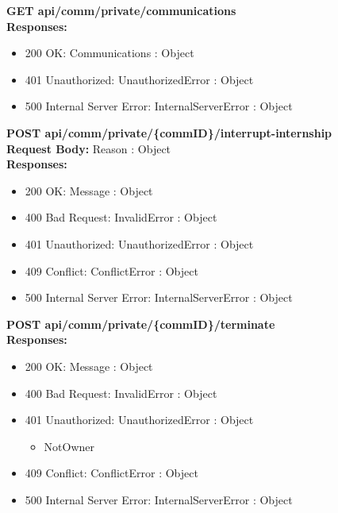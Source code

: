 \noindent\textbf{\color{titleColor}GET api/comm/private/communications}
\vspace{2pt}
\\\textbf{\color{titleColor}Responses:} 
\begin{itemize}
    \item {\color{titleColor}200 OK:} Communications : Object
    \item {\color{titleColor}401 Unauthorized:} UnauthorizedError : Object
    \item {\color{titleColor}500 Internal Server Error:} InternalServerError : Object
\end{itemize}
\vspace{10pt}
\noindent{\color{titleColor}\rule{0.8\linewidth}{0.2mm}}
\vspace{10pt}

\noindent\textbf{\color{titleColor}POST api/comm/private/\{commID\}/interrupt-internship}
\vspace{2pt}
\\\textbf{\color{titleColor}Request Body:} Reason : Object 
\vspace{4pt}
\\\textbf{\color{titleColor}Responses:} 
\begin{itemize}
    \item {\color{titleColor}200 OK:} Message : Object
    \item {\color{titleColor}400 Bad Request:} InvalidError : Object
    \item {\color{titleColor}401 Unauthorized:} UnauthorizedError : Object
    \item {\color{titleColor}409 Conflict:} ConflictError : Object
    \item {\color{titleColor}500 Internal Server Error:} InternalServerError : Object
\end{itemize}
\vspace{10pt}
\noindent{\color{titleColor}\rule{0.8\linewidth}{0.2mm}}
\vspace{10pt}

\noindent\textbf{\color{titleColor}POST api/comm/private/\{commID\}/terminate}
\vspace{2pt}
\\\textbf{\color{titleColor}Responses:} 
\begin{itemize}
    \item {\color{titleColor}200 OK:} Message : Object
    \item {\color{titleColor}400 Bad Request:} InvalidError : Object
    \item {\color{titleColor}401 Unauthorized:} UnauthorizedError : Object
    \begin{itemize}
        \item NotOwner
    \end{itemize}
    \item {\color{titleColor}409 Conflict:} ConflictError : Object
    \item {\color{titleColor}500 Internal Server Error:} InternalServerError : Object
\end{itemize}
\vspace{10pt}
\noindent{\color{titleColor}\rule{0.8\linewidth}{0.2mm}}
\vspace{10pt}

